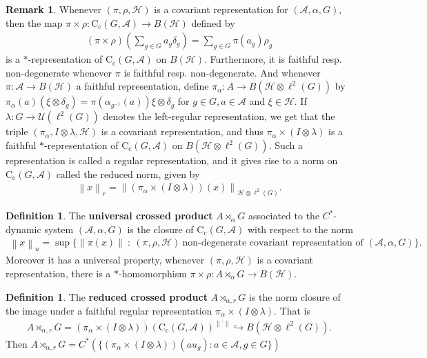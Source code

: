 \documentclass[10pt,oneside,openany,final]{memoir}
\theoremstyle{definition}
\newtheorem{definition}[theorem]{Definition}
\theoremstyle{Break}
\newtheorem*{remark}{Remark}
\newcommand{\lv}{\left\lVert}
\newcommand{\rv}{\right\rVert}
\newcommand{\A}{\mathcal{A}}
\newcommand{\cc}{\text{C}_{\text{c}}}
\renewcommand{\H}{\mathcal{H}}
\begin{document}
\begin{remark}
Whenever $(\pi,\rho,\H)$ is a covariant representation for $(\A,\alpha,G)$, then the map $\pi \times \rho \colon \cc(G,\A) \to B(\H)$ defined by
\begin{align*}
(\pi \times \rho) \left(\sum_{g \in G}a_{g}\delta_{g} \right)= \sum_{g \in G} \pi(a_{g}) \rho_{g}
\end{align*}
is a $*$-representation of $\cc(G,\A)$ on $B(\H)$. Furthermore, it is faithful resp. non-degenerate whenever $\pi$ is faithful resp. non-degenerate.
And whenever $\pi \colon \A \to B(\H)$ a faithful representation, define $\pi_{\alpha} \colon A \to B(\H \otimes \ell^2(G))$ by $\pi_{\alpha}(a)(\xi \otimes \delta_{g})=\pi(\alpha_{g^{-1}}(a))\xi \otimes \delta_{g}$ for $g \in G, a \in \A$ and $\xi \in \H $. If $\lambda \colon G \to \mathcal{U}(\ell^2(G))$ denotes the left-regular representation, we get that the triple $(\pi_{\alpha}, I \otimes \lambda,\H)$ is a covariant representation, and thus $\pi_{\alpha} \times (I \otimes \lambda)$ is a faithful $*$-representation of $\cc(G,\A)$ on $B(\H \otimes \ell^2(G))$. Such a representation is called a regular representation, and it gives rise to a norm on $\cc(G,\A)$ called the reduced norm, given by 
\begin{align*}
\lv x \rv_{r}=\lv (\pi_{\alpha} \times (I \otimes \lambda))(x)\rv_{\H \otimes \ell^2(G)}.
\end{align*}
\end{remark}


\begin{definition}
The \textbf{universal crossed product} $A \rtimes_{\alpha} G$ associated to the $C^*$-dynamic system $(\A,\alpha,G)$ is the closure of $\cc(G,\A)$ with respect to the norm
\begin{align*}
\lv x \rv_{u}=\sup\{\lv \pi(x) \rv \ : \ (\pi,\rho,\H) \ \text{non-degenerate covariant representation of $(\A,\alpha,G)$} \}.
\end{align*} 
Moreover it has a universal property, whenever $(\pi,\rho,\H)$ is a covariant representation, there is a $*$-homomorphism $\pi \times \rho \colon A \rtimes_{\alpha} G \to B(\H)$.
\end{definition}

\begin{definition}
The \textbf{reduced crossed product} $A \rtimes_{\alpha,r}G$ is the norm closure of the image under a faithful regular representation $\pi_{\alpha} \times(I\otimes \lambda)$. That is
\begin{align*}
A \rtimes_{\alpha,r}G= \overline{(\pi_{\alpha}\times(I \otimes \lambda))(\cc(G,\A))}^{\lv \cdot \rv} \hookrightarrow B(\H \otimes \ell^2(G)).
\end{align*}
Then $A \rtimes_{\alpha,r} G=C^*(\{(\pi_{\alpha} \times (I \otimes \lambda))(a u_{g}) \colon a \in \A, g \in G\})$ 
\end{definition}
\end{document}
